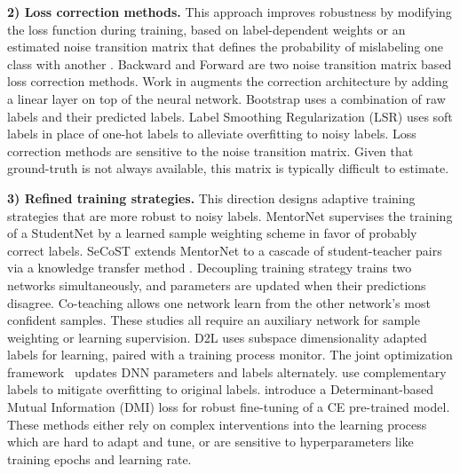 \documentclass{article}
\begin{document}
\noindent\textbf{2) Loss correction methods.}
This approach improves robustness by modifying the loss function during training, based on label-dependent weights \cite{natarajan2013learning} or an estimated noise transition matrix that defines the probability of mislabeling one class with another \cite{han2018masking}. Backward and Forward \cite{patrini2017making} are two noise transition matrix based loss correction methods.
Work in \cite{goldberger2016training,sukhbaatar2014training} augments the correction architecture by adding a linear layer on top of the neural network. Bootstrap \cite{reed2014training}  uses a combination of raw labels and their predicted labels. Label Smoothing Regularization (LSR) \cite{szegedy2016rethinking,pereyra2017regularizing} uses soft labels in place of one-hot labels to alleviate overfitting to noisy labels. Loss correction methods are sensitive to the noise transition matrix. Given that ground-truth is not always available, this matrix is typically difficult to estimate.

\noindent\textbf{3) Refined training strategies.}
This direction designs adaptive training strategies that are more robust to noisy labels. MentorNet \cite{jiang2018mentornet,yu2019does} supervises the training of a StudentNet by a learned sample weighting scheme in favor of probably correct labels. 
SeCoST extends MentorNet to a cascade of student-teacher pairs via a knowledge transfer method \cite{kumar2019secost}.
Decoupling training strategy \cite{malach2017decoupling} trains two networks simultaneously, and parameters are updated when their predictions disagree. 
Co-teaching \cite{han2018co} allows one network learn from the other network's most confident samples. These studies all require an auxiliary network for sample weighting or learning supervision. D2L \cite{ma2018dimensionality} uses subspace dimensionality adapted labels for learning, paired with a training process monitor. 
The joint optimization framework~\cite{tanaka2018joint} updates DNN parameters and labels alternately.
\citet{kim2019nlnl} use complementary labels to mitigate overfitting to original labels. \citet{xu2019l_dmi} introduce a Determinant-based Mutual Information (DMI) loss for robust fine-tuning of a CE pre-trained model. These methods either rely on complex interventions into the learning process which are hard to adapt and tune, or are sensitive to hyperparameters like training epochs and learning rate.
\end{document}
